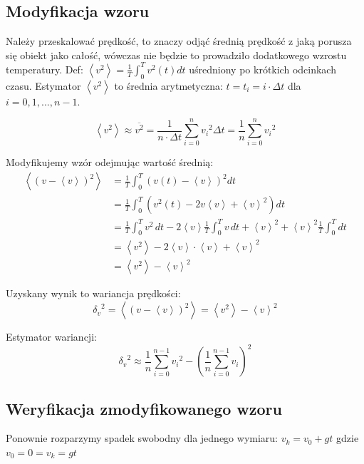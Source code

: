 \documentclass[12pt, letterpaper]{report}
\begin{document}
    \subsection{Modyfikacja wzoru}
    Należy przeskalować prędkość, to znaczy odjąć średnią prędkość z jaką porusza się obiekt jako całość, wówczas nie będzie
    to prowadziło dodatkowego wzrostu temperatury. Def: $\left< v^{2} \right>  =  \frac{1}{T} \int_{0}^{T} v^2(t) dt$
    uśredniony po krótkich odcinkach czasu. Estymator $\left< v^{2} \right>$ to średnia arytmetyczna: 
    $t = t_i = i \cdot \Delta t$ dla $i = 0, 1, ..., n-1$.

    \begin{equation}
        \left< v^{2} \right>  \approx  \overline{v^2} = \frac{1}{n \cdot \Delta t} \sum_{i = 0}^{n} {v_i}^2 \Delta t
        = \frac{1}{n} \sum_{i = 0}^n {v_i}^2
    \end{equation}

    Modyfikujemy wzór odejmując wartość średnią:
    \begin{align*}
        \left< \left( v - \left< v \right> \right)^2 \right>  &=  
        \frac{1}{T} \int_{0}^{T} \left( v(t) - \left< v \right> \right)^2 dt  \\
        &= \frac{1}{T} \int_{0}^{T} \left( v^2(t) - 2v \left< v \right> + \left< v \right>^2 \right) dt  \\
        &= \frac{1}{T} \int_{0}^{T} v^2 \, dt - 2 \left< v \right> \frac{1}{T} \int_{0}^{T} v \, dt + \left< v \right>^2 
        + \left< v \right>^2 \frac{1}{T} \int_{0}^{T} dt \\
        &= \left< v^2 \right> - 2 \left< v \right> \cdot \left< v \right> + \left< v \right>^2 \\
        &= \left< v^2 \right> - \left< v \right>^2
    \end{align*}

    Uzyskany wynik to wariancja prędkości:
    \begin{equation}
        {\delta_v}^2  =  \left< \left( v - \left< v \right> \right)^2 \right>  =  \left< v^2 \right> - \left< v \right>^2
    \end{equation}

    Estymator wariancji:
    \begin{equation}
        {\delta_v}^2  \approx  \frac{1}{n} \sum_{i = 0}^{n - 1} {v_i}^2 - \left( \frac{1}{n} \sum_{i = 0}^{n - 1} {v_i} \right)^2
    \end{equation}

    \subsection{Weryfikacja zmodyfikowanego wzoru}
    Ponownie rozparzymy spadek swobodny dla jednego wymiaru: $v_k = v_0 + gt$ gdzie $v_0 = 0 = v_k = gt$
\end{document}
